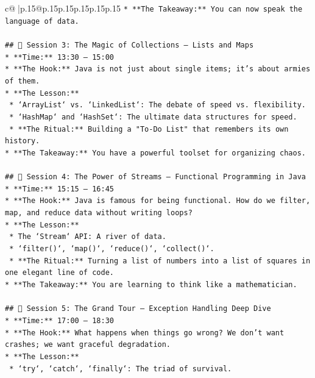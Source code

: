 \documentclass{article}
\begin{document}
{\begin{supertabular}{c@{$\;$}|p{.15\linewidth}@{}p{.15\linewidth}p{.15\linewidth}p{.15\linewidth}p{.15\linewidth}p{.15\linewidth}}
{{{\texttt{*   **The Takeaway:** You can now speak the language of data.} \\
\\ 
\texttt{\#\# 📅 Session 3: The Magic of Collections – Lists and Maps} \\
\texttt{*   **Time:** 13:30 – 15:00} \\
\texttt{*   **The Hook:** Java is not just about single items; it's about armies of them.} \\
\texttt{*   **The Lesson:**} \\
\texttt{    *   `ArrayList` vs. `LinkedList`: The debate of speed vs. flexibility.} \\
\texttt{    *   `HashMap` and `HashSet`: The ultimate data structures for speed.} \\
\texttt{    *   **The Ritual:** Building a "To{-}Do List" that remembers its own history.} \\
\texttt{*   **The Takeaway:** You have a powerful toolset for organizing chaos.} \\
\\ 
\texttt{\#\# 📅 Session 4: The Power of Streams – Functional Programming in Java} \\
\texttt{*   **Time:** 15:15 – 16:45} \\
\texttt{*   **The Hook:** Java is famous for being functional. How do we filter, map, and reduce data without writing loops?} \\
\texttt{*   **The Lesson:**} \\
\texttt{    *   The `Stream` API: A river of data.} \\
\texttt{    *   `filter()`, `map()`, `reduce()`, `collect()`.} \\
\texttt{    *   **The Ritual:** Turning a list of numbers into a list of squares in one elegant line of code.} \\
\texttt{*   **The Takeaway:** You are learning to think like a mathematician.} \\
\\ 
\texttt{\#\# 📅 Session 5: The Grand Tour – Exception Handling Deep Dive} \\
\texttt{*   **Time:** 17:00 – 18:30} \\
\texttt{*   **The Hook:** What happens when things go wrong? We don't want crashes; we want graceful degradation.} \\
\texttt{*   **The Lesson:**} \\
\texttt{    *   `try`, `catch`, `finally`: The triad of survival.} \\
}}}
\end{supertabular}}
\end{document}
